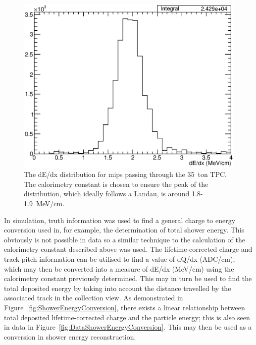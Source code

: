 \begin{figure}
  \centering
  \includegraphics[width=12cm]{dEdx.eps}
  \caption[The dE/dx distribution for mips passing through the 35~ton TPC.]{The dE/dx distribution for mips passing through the 35~ton TPC.  The calorimetry constant is chosen to ensure the peak of the distribution, which ideally follows a Landau, is around 1.8-1.9~MeV/cm.}
  \label{fig:DataCalorimetrydEdx}
\end{figure}

In simulation, truth information was used to find a general charge to energy conversion used in, for example, the determination of total shower energy.  This obviously is not possible in data so a similar technique to the calculation of the calorimetry constant described above was used.  The lifetime-corrected charge and track pitch information can be utilised to find a value of dQ/dx (ADC/cm), which may then be converted into a measure of dE/dx (MeV/cm) using the calorimetry constant previously determined.  This may in turn be used to find the total deposited energy by taking into account the distance travelled by the associated track in the collection view.   As demonstrated in Figure~\ref{fig:ShowerEnergyConversion}, there exists a linear relationship between total deposited lifetime-corrected charge and the particle energy; this is also seen in data in Figure~\ref{fig:DataShowerEnergyConversion}.  This may then be used as a conversion in shower energy reconstruction.

